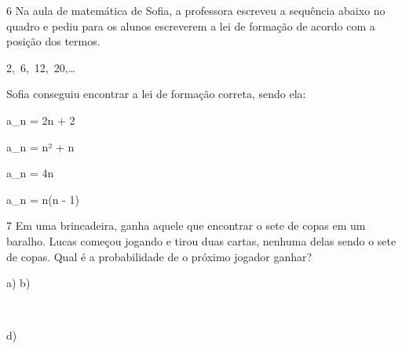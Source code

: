 \num{6} Na aula de matemática de Sofia, a professora escreveu a sequência
abaixo no quadro e pediu para os alunos escreverem a lei de formação de
acordo com a posição dos termos.

2,\ 6,\ 12,\ 20,\ldots

Sofia conseguiu encontrar a lei de formação correta, sendo ela:

\item
  a_{n} = 2n + 2
\item
  a_{n} = n² + n
\item
  a_{n} = 4n
\item
  a_{n} = n(n - 1)




\num{7} Em uma brincadeira, ganha aquele que encontrar o sete de copas em um
baralho. Lucas começou jogando e tirou duas cartas, nenhuma delas sendo
o sete de copas. Qual é a probabilidade de o próximo jogador ganhar?

a) 
b) 


\item
  \ 

d) 



